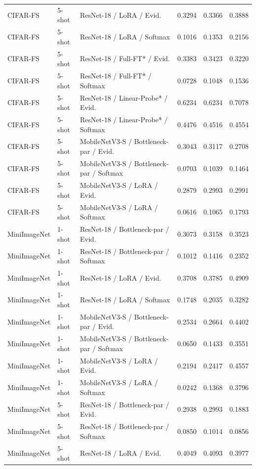\documentclass{iutbscthesis}
\begin{document}
\begin{appendices}
\begin{longtable}{ll >{\raggedright\arraybackslash}p{4.6cm} rrr}
CIFAR-FS & 5-shot & ResNet-18 / LoRA / Evid. & 0.3294 & 0.3366 & 0.3888 \\
CIFAR-FS & 5-shot & ResNet-18 / LoRA / Softmax & 0.1016 & 0.1353 & 0.2156 \\
CIFAR-FS & 5-shot & ResNet-18 / Full-FT* / Evid. & 0.3383 & 0.3423 & 0.3220 \\
CIFAR-FS & 5-shot & ResNet-18 / Full-FT* / Softmax & 0.0728 & 0.1048 & 0.1536 \\
CIFAR-FS & 5-shot & ResNet-18 / Linear-Probe* / Evid. & 0.6234 & 0.6234 & 0.7078 \\
CIFAR-FS & 5-shot & ResNet-18 / Linear-Probe* / Softmax & 0.4476 & 0.4516 & 0.4554 \\
CIFAR-FS & 5-shot & MobileNetV3-S / Bottleneck-par / Evid. & 0.3043 & 0.3117 & 0.2708 \\
CIFAR-FS & 5-shot & MobileNetV3-S / Bottleneck-par / Softmax & 0.0703 & 0.1039 & 0.1464 \\
CIFAR-FS & 5-shot & MobileNetV3-S / LoRA / Evid. & 0.2879 & 0.2993 & 0.2991 \\
CIFAR-FS & 5-shot & MobileNetV3-S / LoRA / Softmax & 0.0616 & 0.1065 & 0.1793 \\
MiniImageNet & 1-shot & ResNet-18 / Bottleneck-par / Evid. & 0.3073 & 0.3158 & 0.3523 \\
MiniImageNet & 1-shot & ResNet-18 / Bottleneck-par / Softmax & 0.1012 & 0.1416 & 0.2352 \\
MiniImageNet & 1-shot & ResNet-18 / LoRA / Evid. & 0.3708 & 0.3785 & 0.4909 \\
MiniImageNet & 1-shot & ResNet-18 / LoRA / Softmax & 0.1748 & 0.2035 & 0.3282 \\
MiniImageNet & 1-shot & MobileNetV3-S / Bottleneck-par / Evid. & 0.2534 & 0.2664 & 0.4402 \\
MiniImageNet & 1-shot & MobileNetV3-S / Bottleneck-par / Softmax & 0.0650 & 0.1433 & 0.3551 \\
MiniImageNet & 1-shot & MobileNetV3-S / LoRA / Evid. & 0.2194 & 0.2417 & 0.4557 \\
MiniImageNet & 1-shot & MobileNetV3-S / LoRA / Softmax & 0.0242 & 0.1368 & 0.3796 \\
MiniImageNet & 5-shot & ResNet-18 / Bottleneck-par / Evid. & 0.2938 & 0.2993 & 0.1883 \\
MiniImageNet & 5-shot & ResNet-18 / Bottleneck-par / Softmax & 0.0850 & 0.1014 & 0.0856 \\
MiniImageNet & 5-shot & ResNet-18 / LoRA / Evid. & 0.4049 & 0.4093 & 0.3977 \\

\end{longtable}
\end{appendices}
\end{document}

